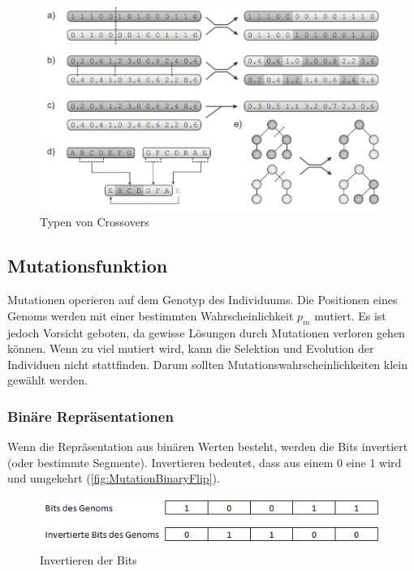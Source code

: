         \begin{figure}[H]
          \includegraphics[width=\textwidth,center]{graphics/crossover_types}
          \caption[\protect{}, S.27]{Typen von Crossovers\label{fig:crossTypes}}
        \end{figure}

    \subsection{Mutationsfunktion~\label{sub:mutFunction}}

      Mutationen operieren auf dem Genotyp des Individuums.
      Die Positionen eines Genoms werden mit einer bestimmten Wahrscheinlichkeit \(p_{m}\) mutiert.
      Es ist jedoch Vorsicht geboten, da gewisse Lösungen durch Mutationen verloren gehen können.
      Wenn zu viel mutiert wird, kann die Selektion und Evolution der Individuen nicht stattfinden.
      Darum sollten Mutationswahrscheinlichkeiten klein gewählt werden.

      \subsubsection{Binäre Repräsentationen}

        Wenn die Repräsentation aus binären Werten besteht, werden die Bits invertiert (oder bestimmte Segmente).
        Invertieren bedeutet, dass aus einem 0 eine 1 wird und umgekehrt (\vref{fig:MutationBinaryFlip}).

        \begin{figure}[H]
          \includegraphics[scale=1,center]{graphics/mutation_binary_flip}
          \caption{Invertieren der Bits\label{fig:MutationBinaryFlip}}
        \end{figure}

